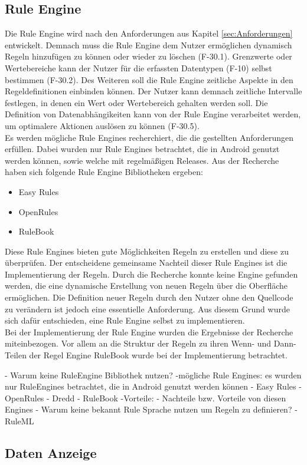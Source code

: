\subsection{Rule Engine}
Die Rule Engine wird nach den Anforderungen aus Kapitel \ref{sec:Anforderungen} entwickelt. Demnach muss die Rule Engine dem Nutzer ermöglichen dynamisch Regeln hinzufügen zu können oder wieder zu löschen (F-30.1). Grenzwerte oder Wertebereiche kann der Nutzer für die erfassten Datentypen (F-10) selbst bestimmen (F-30.2). Des Weiteren soll die Rule Engine zeitliche Aspekte in den Regeldefinitionen einbinden können. Der Nutzer kann demnach zeitliche Intervalle festlegen, in denen ein Wert oder Wertebereich gehalten werden soll. Die Definition von Datenabhängikeiten kann von der Rule Engine verarbeitet werden, um optimalere Aktionen auslösen zu können (F-30.5).\\
Es werden mögliche Rule Engines recherchiert, die die gestellten Anforderungen erfüllen. Dabei wurden nur Rule Engines betrachtet, die in Android genutzt werden können, sowie welche mit regelmäßigen Releases. Aus der Recherche haben sich folgende Rule Engine Bibliotheken ergeben:
\begin{itemize}
\item Easy Rules \cite{github:easyrules}
\item OpenRules \cite{openrules}
\item RuleBook \cite{github:rulebook}
\end{itemize}
Diese Rule Engines bieten gute Möglichkeiten Regeln zu erstellen und diese zu überprüfen. Der entscheidene gemeinsame Nachteil dieser Rule Engines ist die Implementierung der Regeln. Durch die Recherche konnte keine Engine gefunden werden, die eine dynamische Erstellung von neuen Regeln über die Oberfläche ermöglichen. Die Definition neuer Regeln durch den Nutzer ohne den Quellcode zu verändern ist jedoch eine essentielle Anforderung. Aus diesem Grund wurde sich dafür entschieden, eine Rule Engine selbst zu implementieren.\\
Bei der Implementierung der Rule Engine wurden die Ergebnisse der Recherche miteinbezogen. Vor allem an die Struktur der Regeln zu ihren Wenn- und Dann-Teilen der Regel Engine RuleBook wurde bei der Implementierung betrachtet.


- Warum keine RuleEngine Bibliothek nutzen?
	-mögliche Rule Engines: es wurden nur RuleEngines betrachtet, die in Android genutzt werden können
		- Easy Rules
		- OpenRules
		- Dredd
		- RuleBook
			-Vorteile:  
		- Nachteile bzw. Vorteile von diesen Engines
- Warum keine bekannt Rule Sprache nutzen um Regeln zu definieren? - RuleML

\subsection{Daten Anzeige}